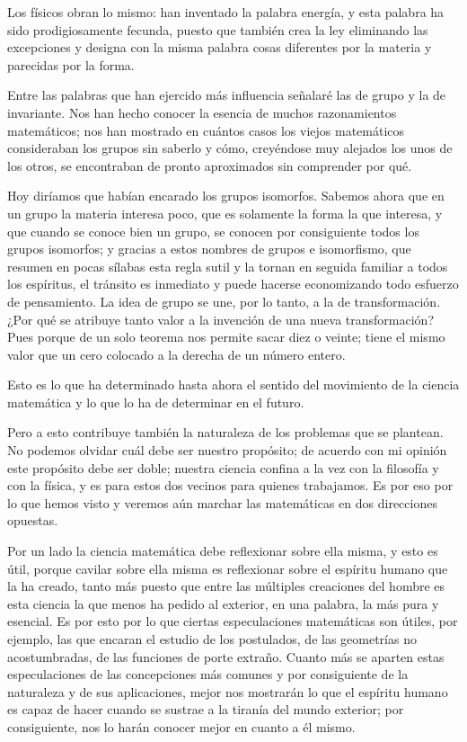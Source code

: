 \documentclass[a4paper, 12pt]{article}
\begin{document}
Los físicos obran lo mismo: han inventado la palabra energía, y
esta palabra ha sido prodigiosamente fecunda, puesto que también crea la
ley eliminando las excepciones y designa con la misma palabra cosas
diferentes por la materia y parecidas por la forma.

Entre las palabras que han ejercido más influencia señalaré las
de grupo y la de invariante. Nos han hecho conocer la esencia de muchos
razonamientos matemáticos; nos han mostrado en cuántos casos los
viejos matemáticos consideraban los grupos sin saberlo y cómo, creyéndose muy alejados los unos de los otros, se encontraban de pronto
aproximados sin comprender por qué.

Hoy diríamos que habían encarado los grupos isomorfos. Sabemos
ahora que en un grupo la materia interesa poco, que es solamente la forma la
que interesa, y que cuando se conoce bien un grupo, se conocen por
consiguiente todos los grupos isomorfos; y gracias a estos nombres de
grupos e isomorfismo, que resumen en pocas sílabas esta regla sutil y la tornan en
seguida familiar a todos los espíritus, el tránsito es inmediato y
puede hacerse economizando todo esfuerzo de pensamiento. La idea de grupo se
une, por lo tanto, a la de transformación. ¿Por qué se atribuye
tanto valor a la invención de una nueva transformación? Pues porque
de un solo teorema nos permite sacar diez o veinte; tiene el mismo valor
que un cero colocado a la derecha de un número entero.

Esto es lo que ha determinado hasta ahora el sentido del movimiento de la
ciencia matemática y lo que lo ha de determinar en el futuro.

Pero a esto contribuye también la naturaleza de los problemas que se
plantean. No podemos olvidar cuál debe ser nuestro propósito; de
acuerdo con mi opinión este propósito debe ser doble; nuestra
ciencia confina a la vez con la filosofía y con la física, y es
para estos dos vecinos para quienes trabajamos. Es por eso por lo que hemos
visto y veremos aún marchar las matemáticas en dos direcciones
opuestas.

Por un lado la ciencia matemática debe reflexionar sobre ella misma, y
esto es útil, porque cavilar sobre ella misma es reflexionar sobre el espíritu humano que la ha creado, tanto más puesto que entre las múltiples creaciones del hombre es esta ciencia la que menos ha pedido al
exterior, en una palabra, la más pura y esencial. Es por esto por lo que
ciertas especulaciones matemáticas son útiles, por ejemplo, las que
encaran el estudio de los postulados, de las geometrías no
acostumbradas, de las funciones de porte extraño. Cuanto más se
aparten estas especulaciones de las concepciones más comunes y por
consiguiente de la naturaleza y de sus aplicaciones, mejor nos mostrarán
lo que el espíritu humano es capaz de hacer cuando se sustrae a la tiranía del mundo exterior; por consiguiente, nos lo harán conocer
mejor en cuanto a él mismo.
\end{document}
